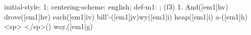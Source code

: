 initial-style: 1;
centering-scheme: english;
def-m1: \grealign;
(f3) 1. And([em1]hv) drove([em1]hv) each([em1]iv) bill'-([em1]jv)wy([em1]i) heap([em1]i) a-([em1]h) <sp> </sp>() way,([em1]g)